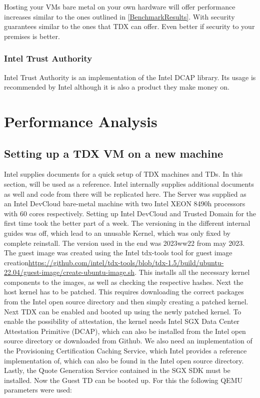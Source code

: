 Hosting your VMs bare metal on your own hardware will offer performance increases similar to the ones outlined in \ref{BenchmarkResults}. With security guarantees similar to the ones that TDX can offer. Even better if security to your premises is better.

\todo{}

\subsection{Intel Trust Authority}

Intel Trust Authority is an implementation of the Intel DCAP library. Its usage is recommended by Intel although it is also a product they make money on.

\chapter{Performance Analysis}

\section{Setting up a TDX VM on a new machine}
\label{ch:SettingUpTDX}
Intel supplies documents for a quick setup of TDX machines and TDs. In this section, \cite{noauthor_white_nodate} will be used as a reference. Intel internally supplies additional documents as well and code from there will be replicated here. The Server was supplied as an Intel DevCloud bare-metal machine with two Intel XEON 8490h processors with 60 cores respectively. Setting up Intel DevCloud and Trusted Domain for the first time took the better part of a week. The versioning in the different internal guides was off, which lead to an unusable Kernel, which was only fixed by complete reinstall. The version used in the end was 2023ww22 from may 2023. The guest image was created using the Intel tdx-tools tool for guest image creation\url{https://github.com/intel/tdx-tools/blob/tdx-1.5/build/ubuntu-22.04/guest-image/create-ubuntu-image.sh}.
This installs all the necessary kernel components to the images, as well as checking the respective hashes. Next the host kernel has to be patched. This requires downloading the correct packages from the Intel open source directory and then simply creating a patched kernel. Next TDX can be enabled and booted up using the newly patched kernel. To enable the possibility of attestation, the kernel needs Intel SGX Data Center Attestation Primitive (DCAP), which can also be installed from the Intel open source directory or downloaded from Github. We also need an implementation of the Provisioning Certification Caching Service, which Intel provides a reference implementation of, which can also be found in the Intel open source directory. Lastly, the Quote Generation Service contained in the SGX SDK must be installed. Now the Guest TD can be booted up. For this the following QEMU parameters were used:


